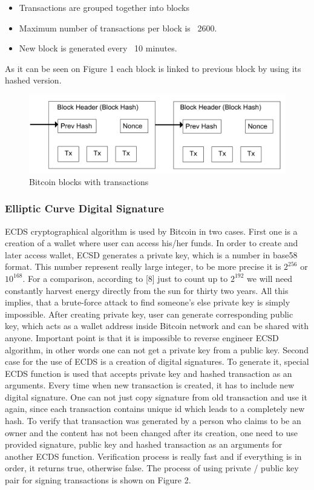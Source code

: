\documentclass[conference,compsoc]{IEEEtran}
\begin{document}
\begin{itemize}
  \item Transactions are grouped together into blocks 
  \item Maximum number of transactions per block is ~2600. 
  \item New block is generated every ~10 minutes.
\end{itemize}

As it can be seen on Figure 1 each block is linked to previous block by using its hashed version. 

\begin{figure}[h!]
  \centering
  \includegraphics[width=.45\textwidth]{graphics/blocks.png}
  \caption{Bitcoin blocks with transactions}
  \label{fig:fig1}
\end{figure}

\subsubsection{Elliptic Curve Digital Signature}
ECDS cryptographical algorithm is used by Bitcoin in two cases. 
First one is a creation of a wallet where user can access his/her funds.
In order to create and later access wallet, ECSD generates a private key, which is a number in base58 format. This number represent really large integer, to be more precise it is $2^{256}$ or $10^{168}$. 
For a comparison, according to [8] just to count up to $2^{192}$ we will need constantly harvest energy directly from the sun for thirty two years. 
All this implies, that a brute-force attack to find someone's else private key is simply impossible. 
After creating private key, user can generate corresponding public key, which acts as a wallet address inside Bitcoin network and can be shared with anyone. 
Important point is that it is impossible to reverse engineer ECSD algorithm, in other words one can not get a private key from a public key.
Second case for the use of ECDS is a creation of digital signatures.
To generate it, special ECDS function is used that accepts private key and hashed transaction as an arguments. 
Every time when new transaction is created, it has to include new digital signature.
One can not just copy signature from old transaction and use it again, since each transaction contains unique id which leads to a completely new hash.  
To verify that transaction was generated by a person who claims to be an owner and the content has not been changed after its creation, one need to use provided signature, public key and hashed transaction as an arguments for another ECDS function. 
Verification process is really fast and if everything is in order, it returns true, otherwise false.
The process of using private / public key pair for signing transactions is shown on Figure 2.
\end{document}
